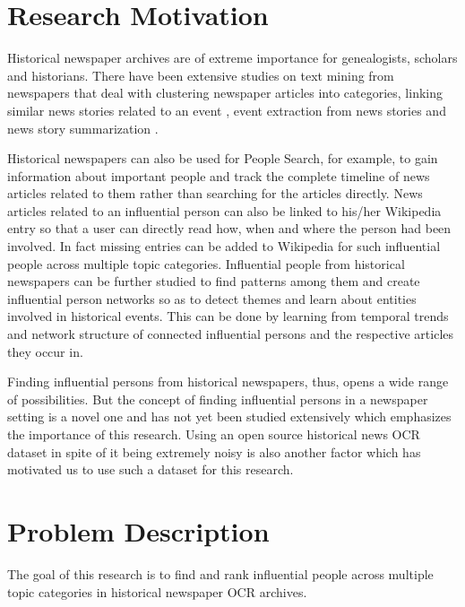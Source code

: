 


\section {Research Motivation}

Historical newspaper archives are of extreme importance for genealogists, scholars and historians. 
There have been extensive studies on text mining from newspapers that deal with clustering newspaper articles into categories\cite{dutta2011learning}, linking similar news stories related to an event \cite{khurdiya2011multi}\cite{shahaf2010connecting}, event extraction from news stories and news story summarization \cite{mckeown2002tracking}.


Historical newspapers can also be used for People Search, for example, to gain information about important people and track the complete timeline of news articles related to them rather than searching for the articles directly. News articles related to an influential person can also be linked to his/her Wikipedia entry so that a user can directly read how, when and where the person had been involved. In fact missing entries can be added to Wikipedia for such influential people across multiple topic categories.
Influential people from historical newspapers can be further studied to find patterns among them and create influential person networks so as to detect themes and learn about entities involved in historical events. This can be done by learning from temporal trends and network structure of connected influential persons and the respective articles they occur in. 


Finding influential persons from historical newspapers, thus,  opens a wide range of possibilities. But the concept of finding influential persons in a newspaper setting is a novel one and has not yet been studied extensively which emphasizes the importance of this research. Using an open source historical news OCR dataset in spite of it being extremely noisy is also another factor which has motivated us to use such a dataset for this research.


\section{Problem Description}
\label{problem}


The goal of this research is to find and rank influential people across multiple topic categories in historical newspaper OCR archives.


